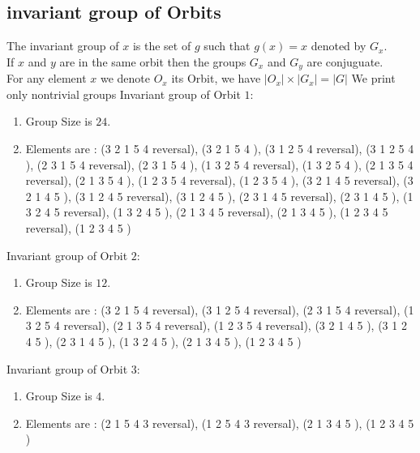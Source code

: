 \documentclass[12pt]{article}
\begin{document}
\subsection{invariant group of Orbits}
\noindent The invariant group of $x$ is the set of $g$ such that $g(x)=x$ denoted by $G_x$.\\
If $x$ and $y$ are in the same orbit then the groups $G_x$ and  $G_y$ are conjuguate.\\
For any element $x$ we denote $O_x$ its Orbit, we have $|O_x|\times |G_x|=|G|$
We print only nontrivial groups
Invariant group of Orbit $1$:
\begin{enumerate}
\item Group Size is $24$.
\item Elements are : (3 2 1 5 4   reversal), (3 2 1 5 4  ), (3 1 2 5 4   reversal), (3 1 2 5 4  ), (2 3 1 5 4   reversal), (2 3 1 5 4  ), (1 3 2 5 4   reversal), (1 3 2 5 4  ), (2 1 3 5 4   reversal), (2 1 3 5 4  ), (1 2 3 5 4   reversal), (1 2 3 5 4  ), (3 2 1 4 5   reversal), (3 2 1 4 5  ), (3 1 2 4 5   reversal), (3 1 2 4 5  ), (2 3 1 4 5   reversal), (2 3 1 4 5  ), (1 3 2 4 5   reversal), (1 3 2 4 5  ), (2 1 3 4 5   reversal), (2 1 3 4 5  ), (1 2 3 4 5   reversal), (1 2 3 4 5  )
\end{enumerate}
Invariant group of Orbit $2$:
\begin{enumerate}
\item Group Size is $12$.
\item Elements are : (3 2 1 5 4   reversal), (3 1 2 5 4   reversal), (2 3 1 5 4   reversal), (1 3 2 5 4   reversal), (2 1 3 5 4   reversal), (1 2 3 5 4   reversal), (3 2 1 4 5  ), (3 1 2 4 5  ), (2 3 1 4 5  ), (1 3 2 4 5  ), (2 1 3 4 5  ), (1 2 3 4 5  )
\end{enumerate}
Invariant group of Orbit $3$:
\begin{enumerate}
\item Group Size is $4$.
\item Elements are : (2 1 5 4 3   reversal), (1 2 5 4 3   reversal), (2 1 3 4 5  ), (1 2 3 4 5  )
\end{enumerate}
\end{document}
